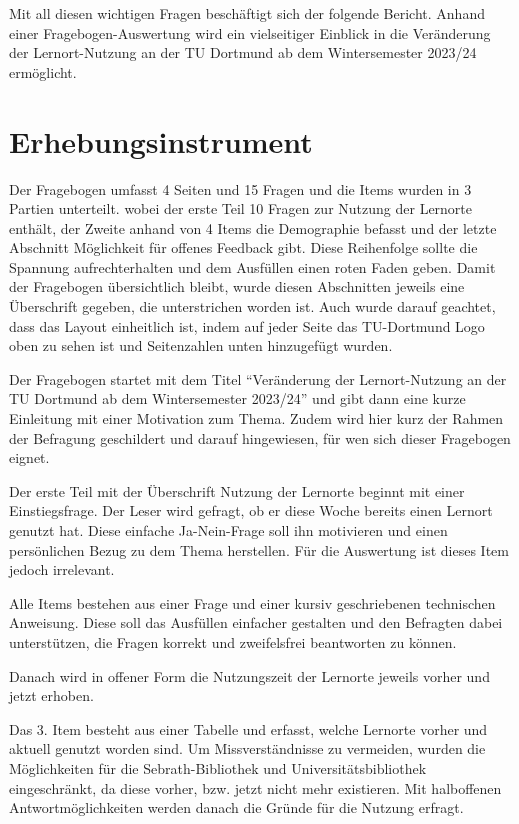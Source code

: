 \documentclass[11pt, a4paper]{article}
\begin{document}
	Mit all diesen wichtigen Fragen beschäftigt sich der folgende Bericht.
	Anhand einer Fragebogen-Auswertung wird ein vielseitiger Einblick in die Veränderung der Lernort-Nutzung an der TU Dortmund ab dem Wintersemester 2023/24 ermöglicht.
	
	
	\newpage
	\section{Erhebungsinstrument}
	\label{Erhebungsinstrument}
	Der Fragebogen umfasst 4 Seiten und 15 Fragen und die Items wurden in 3 Partien unterteilt. wobei der erste Teil 10 Fragen zur Nutzung der Lernorte enthält, der Zweite anhand von 4 Items die Demographie befasst und der letzte Abschnitt Möglichkeit für offenes Feedback gibt.
	Diese Reihenfolge sollte die Spannung aufrechterhalten und dem Ausfüllen einen roten Faden geben. 
	Damit der Fragebogen übersichtlich bleibt, wurde diesen Abschnitten jeweils eine Überschrift gegeben, die unterstrichen worden ist.
	Auch wurde darauf geachtet, dass das Layout einheitlich ist, indem auf jeder Seite das TU-Dortmund Logo oben zu sehen ist und Seitenzahlen unten hinzugefügt wurden.
	
	Der Fragebogen startet mit dem Titel “Veränderung der Lernort-Nutzung an der TU Dortmund ab dem Wintersemester 2023/24” und gibt dann eine kurze Einleitung mit einer Motivation zum Thema. Zudem wird hier kurz der Rahmen der Befragung geschildert und darauf hingewiesen, für wen sich dieser Fragebogen eignet.
	
	Der erste Teil mit der Überschrift Nutzung der Lernorte beginnt mit einer Einstiegsfrage.
	Der Leser wird gefragt, ob er diese Woche bereits einen Lernort genutzt hat. Diese einfache Ja-Nein-Frage soll ihn motivieren und einen persönlichen Bezug zu dem Thema herstellen. Für die Auswertung ist dieses Item jedoch irrelevant.
	
	Alle Items bestehen aus einer Frage und einer kursiv geschriebenen technischen Anweisung. Diese soll das Ausfüllen einfacher gestalten und den Befragten dabei unterstützen, die Fragen korrekt und zweifelsfrei beantworten zu können.
	
	Danach wird in offener Form die Nutzungszeit der Lernorte jeweils vorher und jetzt erhoben. 
	
	Das 3. Item besteht aus einer Tabelle und erfasst, welche Lernorte vorher und aktuell genutzt worden sind.
	Um Missverständnisse zu vermeiden, wurden die Möglichkeiten für die Sebrath-Bibliothek und Universitätsbibliothek eingeschränkt, da diese vorher, bzw. jetzt nicht mehr existieren.
	Mit halboffenen Antwortmöglichkeiten werden danach die Gründe für die Nutzung erfragt.
	
\end{document}
